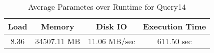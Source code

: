 \documentclass[../../main.tex]{subfiles}
\begin{document}
    \begin{table}
        \begin{center}
            \begin{tabular}{ |c|c|c|c| } 
            \hline
            Load & Memory & Disk IO & Execution Time\\
            \hline
            8.36 & 34507.11 MB & 11.06 MB/sec & 611.50 sec \\
            \hline
            \end{tabular}
            \\[1pt]
            \caption{Average Parametes over Runtime for Query14}
        \end{center}
    \end{table}
    \pagebreak
\end{document}
